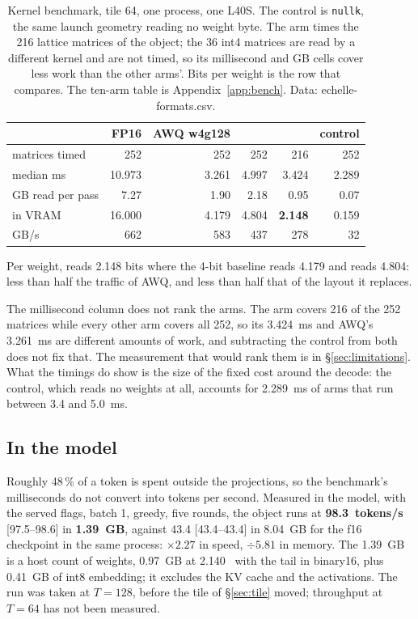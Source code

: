 \begin{table}[t]
\centering\footnotesize\setlength{\tabcolsep}{4pt}
\begin{tabular}{lrrrrr}
\toprule
 & FP16 & AWQ w4g128 & \Planes{} & \Tetra{} & control\\
\midrule
matrices timed & 252 & 252 & 252 & 216 & 252\\
median ms & 10.973 & 3.261 & 4.997 & 3.424 & 2.289\\
GB read per pass & 7.27 & 1.90 & 2.18 & 0.95 & 0.07\\
\bw{} in VRAM & 16.000 & 4.179 & 4.804 & \textbf{2.148} & 0.159\\
GB/s & 662 & 583 & 437 & 278 & 32\\
\bottomrule
\end{tabular}
\caption{Kernel benchmark, tile 64, one process, one L40S. The control is
\texttt{nullk}, the same launch geometry reading no weight byte. The \Tetra{}
arm times the 216 lattice matrices of the object; the 36 int4 matrices are read
by a different kernel and are not timed, so its millisecond and GB cells cover
less work than the other arms'. Bits per weight is the row that compares. The
ten-arm table is Appendix~\ref{app:bench}. Data: echelle-formats.csv.}
\label{tab:bench}
\end{table}

Per weight, \Tetra{} reads 2.148 bits where the 4-bit baseline reads 4.179 and
\Planes{} reads 4.804: less than half the traffic of AWQ, and less than half
that of the layout it replaces.

The millisecond column does not rank the arms. The \Tetra{} arm covers 216 of
the 252 matrices while every other arm covers all 252, so its 3.424~ms and
AWQ's 3.261~ms are different amounts of work, and subtracting the control from
both does not fix that. The measurement that would rank them is in
\S\ref{sec:limitations}. What the timings do show is the size of the fixed cost
around the decode: the control, which reads no weights at all, accounts for
2.289~ms of arms that run between 3.4 and 5.0~ms.

\subsection{In the model}
\label{sec:served}

Roughly 48\,\% of a token is spent outside the projections, so the benchmark's
milliseconds do not convert into tokens per second. Measured in the model, with
the served flags, batch 1, greedy, five rounds, the object runs at
\textbf{98.3~tokens/s} [97.5--98.6] in \textbf{1.39~GB}, against 43.4
[43.4--43.4] in 8.04~GB for the f16 checkpoint in the same process:
$\times2.27$ in speed, $\div5.81$ in memory. The 1.39~GB is a host count of
weights, 0.97~GB at 2.140~\bw{} with the tail in binary16, plus 0.41~GB of int8
embedding; it excludes the KV cache and the activations. The run was taken at
$T=128$, before the tile of \S\ref{sec:tile} moved; throughput at $T=64$ has
not been measured.

